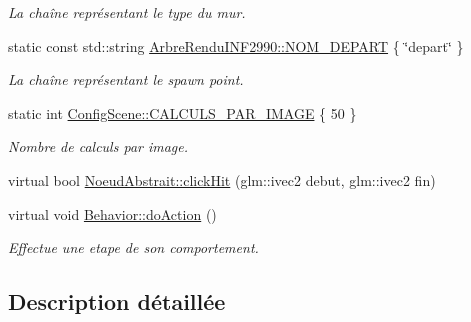 \begin{DoxyCompactItemize}
\begin{DoxyCompactList}\small\item\em La chaîne représentant le type du mur. \end{DoxyCompactList}\item 
\hypertarget{group__inf2990_ga7f23ccbd07f9afea9685f108c4053834}{static const std\-::string \hyperlink{group__inf2990_ga7f23ccbd07f9afea9685f108c4053834}{Arbre\-Rendu\-I\-N\-F2990\-::\-N\-O\-M\-\_\-\-D\-E\-P\-A\-R\-T} \{ \char`\"{}depart\char`\"{} \}}\label{group__inf2990_ga7f23ccbd07f9afea9685f108c4053834}

\begin{DoxyCompactList}\small\item\em La chaîne représentant le spawn point. \end{DoxyCompactList}\item 
\hypertarget{group__inf2990_gadb487b450a0314a5d1f75cf31ce502eb}{static int \hyperlink{group__inf2990_gadb487b450a0314a5d1f75cf31ce502eb}{Config\-Scene\-::\-C\-A\-L\-C\-U\-L\-S\-\_\-\-P\-A\-R\-\_\-\-I\-M\-A\-G\-E} \{ 50 \}}\label{group__inf2990_gadb487b450a0314a5d1f75cf31ce502eb}

\begin{DoxyCompactList}\small\item\em Nombre de calculs par image. \end{DoxyCompactList}\end{DoxyCompactItemize}
\begin{DoxyCompactItemize}
\item 
virtual bool \hyperlink{group__inf2990_gad1d1a9c6adcedfcd5eda6c6d4e67a50f}{Noeud\-Abstrait\-::click\-Hit} (glm\-::ivec2 debut, glm\-::ivec2 fin)
\end{DoxyCompactItemize}
\begin{DoxyCompactItemize}
\item 
virtual void \hyperlink{group__inf2990_gac22f205bc85075ff707ad1f695c18439}{Behavior\-::do\-Action} ()
\begin{DoxyCompactList}\small\item\em Effectue une etape de son comportement. \end{DoxyCompactList}\end{DoxyCompactItemize}


\subsection{Description détaillée}


